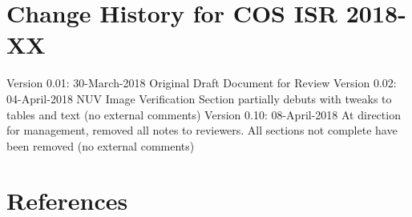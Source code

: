 \documentclass{stsci_report}
\begin{document}
\vspace{-0.3cm}
\vspace{0.3cm}
\section{Change History for COS ISR 2018-XX}\label{sec:History}
\vspace{0.3cm}
Version 0.01: 30-March-2018 Original Draft Document for Review
Version 0.02: 04-April-2018 NUV Image Verification Section partially debuts with tweaks to tables and text (no external comments)
Version 0.10: 08-April-2018 At direction for management, removed all notes to reviewers. All sections not complete have been removed (no external comments)
\vspace{0.3cm}
\section{References}\label{sec:References}
\vspace{0.3cm}
\end{document}
